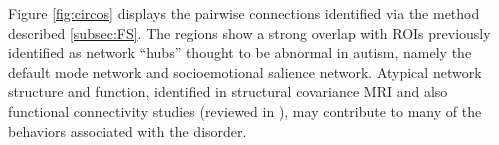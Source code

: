 \documentclass{llncs}
\begin{document}
Figure \ref{fig:circos} displays the pairwise connections identified via the method described \ref{subsec:FS}.  The regions show a strong overlap with ROIs previously identified as network “hubs” thought to be abnormal in autism, namely the default mode network and socioemotional salience network.  Atypical network structure and function, identified in structural covariance MRI \cite{zielinski2012scmri} and also functional connectivity studies (reviewed in \cite{jeff2014}), may contribute to many of the behaviors associated with the disorder.



{}

\end{document}
